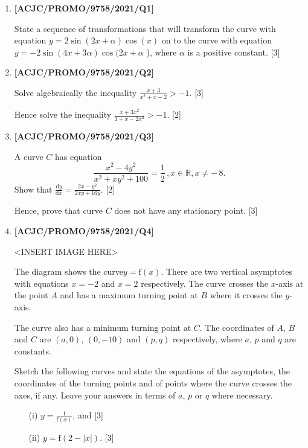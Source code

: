 \documentclass[twoside,english]{article}
\begin{document}
\begin{enumerate}\item \textbf{{[}ACJC/PROMO/9758/2021/Q1{]} }

State a sequence of transformations that will transform the curve
with equation $y=2\sin(2x+\alpha)\cos(x)$ on to the curve with equation
$y=-2\sin(4x+3\alpha)\cos(2x+\alpha$ ), where $\alpha$ is a positive
constant. \hfill{}{[}3{]}

 \newpage 

\item \textbf{{[}ACJC/PROMO/9758/2021/Q2{]}} 

Solve algebraically the inequality $\frac{x+3}{x^{2}+x-2}>-1$. \hfill{}{[}3{]}

Hence solve the inequality $\frac{x+3x^{2}}{1+x-2x^{2}}>-1.$ \hfill{}{[}2{]}

 \newpage 

\item \textbf{{[}ACJC/PROMO/9758/2021/Q3{]}}

A curve $C$ has equation 
\[
\frac{x^{2}-4y^{2}}{x^{2}+xy^{2}+100}=\frac{1}{2}\,,x\in\mathbb{R},x\ne-\,8.
\]
Show that $\frac{\text{d}y}{\text{d}x}=\frac{2x-y^{2}}{2xy+16y}$.
\hfill{}{[}2{]}

Hence, prove that curve $C$ does not have any stationary point. \hfill{}{[}3{]}

 \newpage 

\item \textbf{{[}ACJC/PROMO/9758/2021/Q4{]}}
\noindent \begin{center}
<INSERT IMAGE HERE>
\par\end{center}

The diagram shows the curve$y=\text{f}(x)$. There are two vertical
asymptotes with equations $x=-2$ and $x=2$ respectively. The curve
crosses the $x$-axis at the point $A$ and has a maximum turning
point at $B$ where it crosses the $y$-axis. 

The curve also has a minimum turning point at $C$. The coordinates
of $A$, $B$ and $C$ are $(a,0)$, $(0,-10)$ and $(p,q)$ respectively,
where $a$, $p$ and $q$ are constants. 

Sketch the following curves and state the equations of the asymptotes,
the coordinates of the turning points and of points where the curve
crosses the axes, if any. Leave your answers in terms of $a$, $p$
or $q$ where necessary. 
\begin{enumerate}
\item[(i)]  $y=\frac{1}{\text{f}(x)}$, and \hfill{}{[}3{]}
\item[(ii)]  $y=\text{f}(2-|x|)$. \hfill{}{[}3{]}
\end{enumerate}


\end{enumerate}
\end{document}
